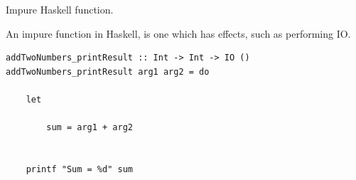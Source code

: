 
\begin{frame}[t, fragile]{Impure Haskell function.}

An impure function in Haskell, is one which has effects, such as
performing IO. \\

\begin{verbatim}
addTwoNumbers_printResult :: Int -> Int -> IO ()
addTwoNumbers_printResult arg1 arg2 = do

    let

        sum = arg1 + arg2


    printf "Sum = %d" sum
\end{verbatim}

\end{frame}
